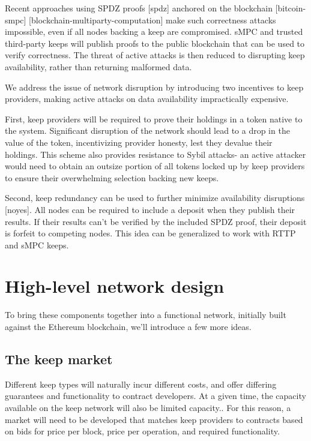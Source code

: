 \documentclass[11pt]{article}
\begin{document}
Recent approaches using SPDZ proofs [spdz] anchored on the blockchain
[bitcoin-smpc] [blockchain-multiparty-computation] make such
correctness attacks impossible, even if all nodes backing a keep are
compromised. sMPC and trusted third-party keeps will publish proofs to
the public blockchain that can be used to verify correctness. The
threat of active attacks is then reduced to disrupting keep
availability, rather than returning malformed data.

We address the issue of network disruption by introducing two
incentives to keep providers, making active attacks on data
availability impractically expensive.

First, keep providers will be required to prove their holdings in a
token native to the system. Significant disruption of the network
should lead to a drop in the value of the token, incentivizing
provider honesty, lest they devalue their holdings. This scheme also
provides resistance to Sybil attacks- an active attacker would need to
obtain an outsize portion of all tokens locked up by keep providers to
ensure their overwhelming selection backing new keeps.

Second, keep redundancy can be used to further minimize availability
disruptions [noyes]. All nodes can be required to include a deposit
when they publish their results. If their results can’t be verified by
the included SPDZ proof, their deposit is forfeit to competing nodes.
This idea can be generalized to work with RTTP and sMPC keeps.

\section{High-level network design}

To bring these components together into a functional network,
initially built against the Ethereum blockchain, we’ll introduce a few
more ideas.

\subsection{The keep market}

Different keep types will naturally incur different costs, and offer
differing guarantees and functionality to contract developers. At a
given time, the capacity available on the keep network will also be
limited capacity.. For this reason, a market will need to be developed
that matches keep providers to contracts based on bids for price per
block, price per operation, and required functionality.
\end{document}
